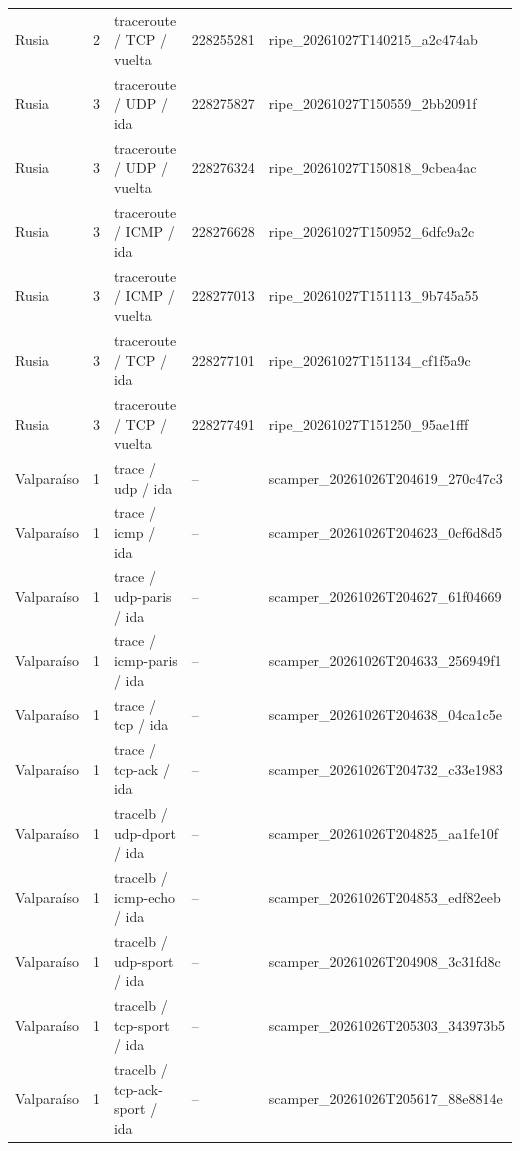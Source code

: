 \begin{longtable}{p{2cm}p{1.15cm}p{4.2cm}p{2.2cm}p{4.95cm}}
Rusia & 2 & traceroute / TCP / vuelta & 228255281 & ripe\_\allowbreak{}20261027T140215\_\allowbreak{}a2c474ab \\
Rusia & 3 & traceroute / UDP / ida & 228275827 & ripe\_\allowbreak{}20261027T150559\_\allowbreak{}2bb2091f \\
Rusia & 3 & traceroute / UDP / vuelta & 228276324 & ripe\_\allowbreak{}20261027T150818\_\allowbreak{}9cbea4ac \\
Rusia & 3 & traceroute / ICMP / ida & 228276628 & ripe\_\allowbreak{}20261027T150952\_\allowbreak{}6dfc9a2c \\
Rusia & 3 & traceroute / ICMP / vuelta & 228277013 & ripe\_\allowbreak{}20261027T151113\_\allowbreak{}9b745a55 \\
Rusia & 3 & traceroute / TCP / ida & 228277101 & ripe\_\allowbreak{}20261027T151134\_\allowbreak{}cf1f5a9c \\
Rusia & 3 & traceroute / TCP / vuelta & 228277491 & ripe\_\allowbreak{}20261027T151250\_\allowbreak{}95ae1fff \\
Valparaíso & 1 & trace / udp / ida & -- & scamper\_\allowbreak{}20261026T204619\_\allowbreak{}270c47c3 \\
Valparaíso & 1 & trace / icmp / ida & -- & scamper\_\allowbreak{}20261026T204623\_\allowbreak{}0cf6d8d5 \\
Valparaíso & 1 & trace / udp-paris / ida & -- & scamper\_\allowbreak{}20261026T204627\_\allowbreak{}61f04669 \\
Valparaíso & 1 & trace / icmp-paris / ida & -- & scamper\_\allowbreak{}20261026T204633\_\allowbreak{}256949f1 \\
Valparaíso & 1 & trace / tcp / ida & -- & scamper\_\allowbreak{}20261026T204638\_\allowbreak{}04ca1c5e \\
Valparaíso & 1 & trace / tcp-ack / ida & -- & scamper\_\allowbreak{}20261026T204732\_\allowbreak{}c33e1983 \\
Valparaíso & 1 & tracelb / udp-dport / ida & -- & scamper\_\allowbreak{}20261026T204825\_\allowbreak{}aa1fe10f \\
Valparaíso & 1 & tracelb / icmp-echo / ida & -- & scamper\_\allowbreak{}20261026T204853\_\allowbreak{}edf82eeb \\
Valparaíso & 1 & tracelb / udp-sport / ida & -- & scamper\_\allowbreak{}20261026T204908\_\allowbreak{}3c31fd8c \\
Valparaíso & 1 & tracelb / tcp-sport / ida & -- & scamper\_\allowbreak{}20261026T205303\_\allowbreak{}343973b5 \\
Valparaíso & 1 & tracelb / tcp-ack-sport / ida & -- & scamper\_\allowbreak{}20261026T205617\_\allowbreak{}88e8814e \\

\end{longtable}

